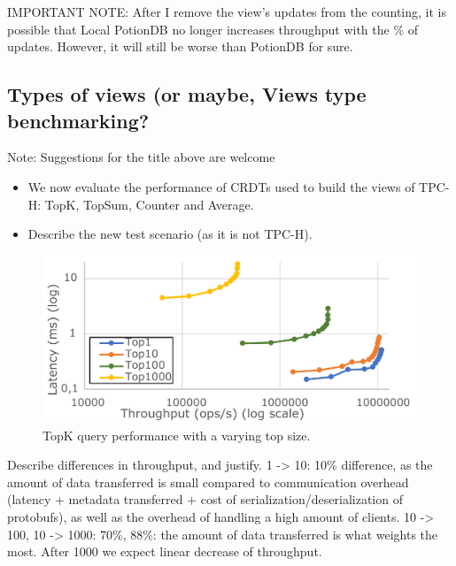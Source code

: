\documentclass[sigplan,10pt]{acmart}
\begin{document}
IMPORTANT NOTE: After I remove the view's updates from the counting, it is possible that Local PotionDB no longer increases throughput with the \% of updates. However, it will still be worse than PotionDB for sure.

\subsection{Types of views (or maybe, Views type benchmarking?}

Note: Suggestions for the title above are welcome

\begin{itemize}
	\item We now evaluate the performance of CRDTs used to build the views of TPC-H: TopK, TopSum, Counter and Average.
	\item Describe the new test scenario (as it is not TPC-H).
\end{itemize}

\begin{figure}[h]
	\centering
	\includegraphics[width=.7\linewidth]{TopKTopSize0upd_cut}
	\caption{TopK query performance with a varying top size.}
	\label{fig:(new)TopkSize0upd}
\end{figure}

Describe differences in throughput, and justify. 1 -> 10: 10\% difference, as the amount of data transferred is small compared to communication overhead (latency + metadata transferred + cost of serialization/deserialization of protobufs), as well as the overhead of handling a high amount of clients. 10 -> 100, 10 -> 1000: 70\%, 88\%: the amount of data transferred is what weights the most. After 1000 we expect linear decrease of throughput.
\end{document}
